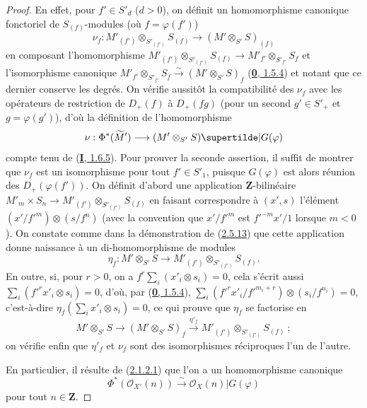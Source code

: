 \begin{proof}
En effet, pour $f'\in S'_d$ ($d>0$), on définit un homomorphisme canonique
fonctoriel de $S_{(f)}$-modules (où $f=\varphi(f')$)
\[
\label{II.2.8.8.1-fr}
  \nu_f:M'_{(f')}\otimes_{S'_{(f')}}S_{(f)}
  \longrightarrow(M'\otimes_{S'}S)_{(f)}
\tag{2.8.8.1}
\]
en composant l'homomorphisme
$M'_{(f')}\otimes_{S'_{(f')}}S_{(f)}\to
M'_{f'}\otimes_{S'_{f'}}S_f$ et l'isomorphisme canonique
$M'_{f'}\otimes_{S'_{f'}}S_f\xrightarrow{\sim}(M'\otimes_{S'}S)_f$
(\hyperref[0.1.5.4-fr]{\textbf{0}, 1.5.4}) et notant que ce dernier conserve les
degrés. On vérifie aussitôt la compatibilité des $\nu_f$ avec les opérateurs
de restriction de $D_+(f)$ à $D_+(fg)$ (pour un second $g'\in S'_+$ et
$g=\varphi(g')$), d'où la définition de l'homomorphisme
\[
  \nu:\Phi^*(\widetilde{M}')
  \longrightarrow(M'\otimes_{S'}S)\supertilde|G(\varphi)
\]
compte tenu de (\hyperref[I.1.6.5-fr]{\textbf{I}, 1.6.5}). Pour prouver la seconde
assertion, il suffit de montrer que $\nu_f$ est un isomorphisme pour tout
$f'\in S'_1$, puisque $G(\varphi)$ est alors réunion des
$D_+(\varphi(f'))$. On définit d'abord une application $\mathbf{Z}$-bilinéaire
$M'_m\times S_n\to M'_{(f')}\otimes_{S'_{(f')}}S_{(f)}$ en faisant
correspondre à $(x',s)$ l'élément
$(x'/{f'}^m)\otimes(s/f^n)$ (avec la convention que $x'/{f'}^m$ est
${f'}^{-m}x'/1$
lorsque $m<0$). On constate comme dans la démonstration de
(\hyperref[II.2.5.13-fr]{2.5.13}) que cette application donne naissance à un
di-homomorphisme de modules
\[
  \eta_f:M'\otimes_{S'}S
  \longrightarrow M'_{(f')}\otimes_{S'_{(f')}}S_{(f)}.
\]
En outre, si, pour $r>0$, on a
$f^r\sum_i(x'_i\otimes s_i)=0$, cela s'écrit aussi
$\sum_i({f'}^rx'_i\otimes s_i)=0$, d'où, par
(\hyperref[0.1.5.4-fr]{\textbf{0}, 1.5.4}),
$\sum_i({f'}^rx'_i/{f'}^{m_i+r})\otimes(s_i/f^{n_i})=0$, c'est-à-dire
$\eta_f(\sum_i x'_i\otimes s_i)=0$, ce qui prouve que $\eta_f$ se factorise
en
\[
  M'\otimes_{S'}S\longrightarrow(M'\otimes_{S'}S)_f
  \xrightarrow{\eta'_f}M'_{(f')}\otimes_{S'_{(f')}}S_{(f)}~;
\]
on vérifie enfin que $\eta'_f$ et $\nu_f$ sont des isomorphismes réciproques
l'un de l'autre.

En particulier, il résulte de (\hyperref[II.2.1.2.1-fr]{2.1.2.1}) que l'on a
un homomorphisme canonique
\[
\label{II.2.8.8.2-fr}
  \Phi^*(\mathcal{O}_{X'}(n))\xrightarrow{\sim}
  \mathcal{O}_X(n)|G(\varphi)
\tag{2.8.8.2}
\]
pour tout $n\in\mathbf{Z}$.
\end{proof}

